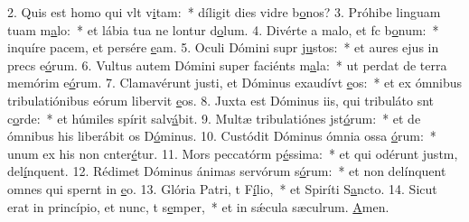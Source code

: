 2. Quis est homo qui vlt v\uline{i}tam:~* díligit dies vidre b\uline{o}nos?
3. Próhibe linguam tuam  m\uline{a}lo:~* et lábia tua ne lontur d\uline{o}lum.
4. Divérte a malo, et fc b\uline{o}num:~* inquíre pacem, et persére \uline{e}am.
5. Oculi Dómini supr j\uline{u}stos:~* et aures ejus in precs e\uline{ó}rum.
6. Vultus autem Dómini super faciénts m\uline{a}la:~* ut perdat de terra memórim e\uline{ó}rum.
7. Clamavérunt justi, et Dóminus exaudívt \uline{e}os:~* et ex ómnibus tribulatiónibus eórum libervit \uline{e}os.
8. Juxta est Dóminus iis, qui tribuláto snt c\uline{o}rde:~* et húmiles spírit salv\uline{á}bit.
9. Multæ tribulatiónes jst\uline{ó}rum:~* et de ómnibus his liberábit os D\uline{ó}minus.
10. Custódit Dóminus ómnia ossa \uline{ó}rum:~* unum ex his non cnter\uline{é}tur.
11. Mors peccatórm p\uline{é}ssima:~* et qui odérunt justm, del\uline{í}nquent.
12. Rédimet Dóminus ánimas servórum s\uline{ó}rum:~* et non delínquent omnes qui spernt in \uline{e}o.
13. Glória Patri, t F\uline{í}lio,~* et Spiríti S\uline{a}ncto.
14. Sicut erat in princípio, et nunc, t s\uline{e}mper,~* et in sǽcula sæculrum. \uline{A}men.
